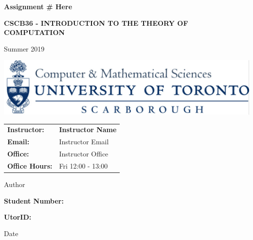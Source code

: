 \documentclass{article}
\begin{document}
\begin{titlepage}
\begin{center}
  \vspace{5cm}



  \huge{\textbf{Assignment \# Here}}\\


  \hrulefill
  \vspace{0.3cm}

  \textbf{\huge CSCB36 - INTRODUCTION TO
THE THEORY OF COMPUTATION}

  \hrulefill

  \vspace{0.5cm}

  {Summer 2019}

    \vspace{1cm}

 \includegraphics[trim={0 0 0.1cm 0},clip, scale = 0.1]{CSM}

  \vspace{4cm}
    

  \end{center}



  \begin{center}

  \begin{tabular}{ll}
      \textbf{Instructor:} & \textbf{Instructor Name}\\
  \textbf{Email:} & Instructor Email\\
  \textbf{Office:} & Instructor Office\\
  \textbf{Office Hours:}& Fri 12:00 - 13:00\\
  \end{tabular}

  \vspace{2cm}

  Author

  \textbf{Student Number: }

  \textbf{UtorID: }

Date


  \end{center}


\end{titlepage}
\pagestyle{fancy}

\vspace{0.5cm}
\rhead{\leftmark}
\cfoot{}

\text{}

\end{document}
